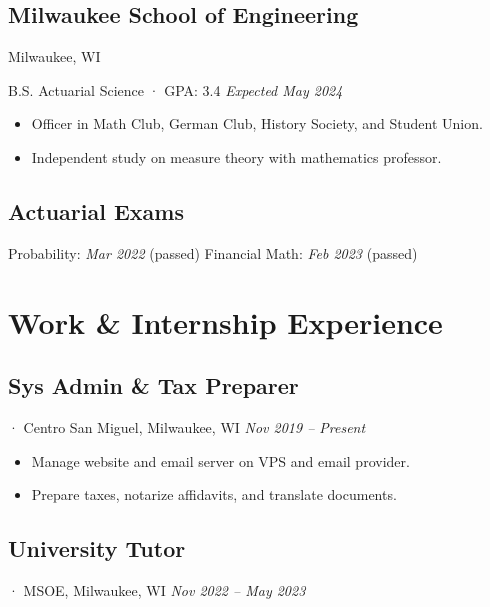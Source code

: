 \documentclass[12pt]{article}
\newcommand{\itemspace}[0]{
  \vspace{0.3170em}
}
\begin{document}
\subsection{Milwaukee School of Engineering} \hfill Milwaukee, WI

B.S. Actuarial Science · GPA: 3.4 \hfill \textit{Expected May 2024}

\begin{itemize}[noitemsep,nolistsep]
  \item Officer in Math Club, German Club, History Society, and Student Union.

  \item Independent study on measure theory with mathematics professor.
\end{itemize}

\itemspace

\subsection{Actuarial Exams} \hfill

Probability:\; \textit{Mar 2022} (passed)
\hfill
Financial Math:\; \textit{Feb 2023} (passed)

\itemspace

\section{Work \& Internship Experience}

\subsection{Sys Admin \& Tax Preparer}
· Centro San Miguel, Milwaukee, WI \hfill \textit{Nov 2019 -- Present}

\begin{itemize}[noitemsep,nolistsep]
  \item Manage website and email server on VPS and email provider.

  \item Prepare taxes, notarize affidavits, and translate documents.
\end{itemize}

\itemspace

\subsection{University Tutor}
· MSOE, Milwaukee, WI \hfill \textit{Nov 2022 -- May 2023}
\end{document}
